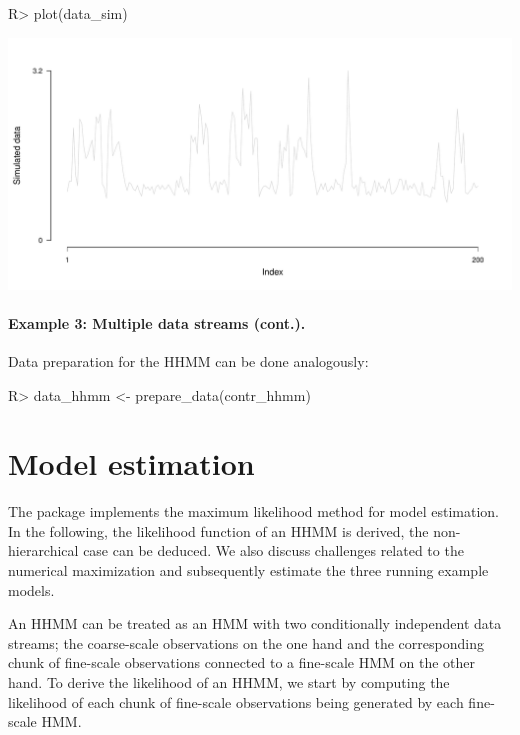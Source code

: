 \documentclass[article]{jss}
\begin{document}
%
\begin{Schunk}
\begin{Sinput}
R> plot(data_sim)
\end{Sinput}
\end{Schunk}
\includegraphics{fhmm_oelschlaeger_adam_michels-sim-data-ts}
%

\paragraph{Example 3: Multiple data streams (cont.).} Data preparation for the HHMM can be done analogously:

%
\begin{Schunk}
\begin{Sinput}
R> data_hhmm <- prepare_data(contr_hhmm)
\end{Sinput}
\end{Schunk}
%

\section{Model estimation} \label{sec:model_estimation} %

The  package implements the maximum likelihood method for model estimation. In the following, the likelihood function of an HHMM is derived, the non-hierarchical case can be deduced. We also discuss challenges related to the numerical maximization and subsequently estimate the three running example models.

An HHMM can be treated as an HMM with two conditionally independent data streams; the coarse-scale observations on the one hand and the corresponding chunk of fine-scale observations connected to a fine-scale HMM on the other hand. To derive the likelihood of an HHMM, we start by computing the likelihood of each chunk of fine-scale observations being generated by each fine-scale HMM. 
\end{document}
